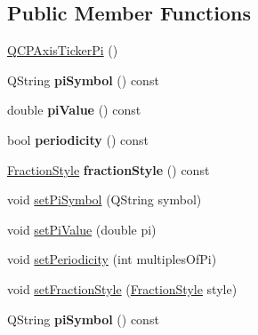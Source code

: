 \subsection*{Public Member Functions}
\begin{DoxyCompactItemize}
\item 
\hyperlink{class_q_c_p_axis_ticker_pi_aa0d7b7034055927c0f0077a2d713d7d0}{Q\+C\+P\+Axis\+Ticker\+Pi} ()
\item 
\mbox{\label{class_q_c_p_axis_ticker_pi_a2fd785cd66a6f4f969ac2eca1b08e0f2}} 
Q\+String {\bfseries pi\+Symbol} () const
\item 
\mbox{\label{class_q_c_p_axis_ticker_pi_abddc18799caa4ae6c721e1e5e229b3a4}} 
double {\bfseries pi\+Value} () const
\item 
\mbox{\label{class_q_c_p_axis_ticker_pi_aa320edf0a30386ce6a63c18050fbdfd8}} 
bool {\bfseries periodicity} () const
\item 
\mbox{\label{class_q_c_p_axis_ticker_pi_ab532d5e838168a8a5bbafea4eafc94be}} 
\hyperlink{class_q_c_p_axis_ticker_pi_a262f1534c7f0c79a7d5237f5d1e2c54c}{Fraction\+Style} {\bfseries fraction\+Style} () const
\item 
void \hyperlink{class_q_c_p_axis_ticker_pi_acfdcd4758a393bde4be12a50fb2017b5}{set\+Pi\+Symbol} (Q\+String symbol)
\item 
void \hyperlink{class_q_c_p_axis_ticker_pi_a36ce0651d2ec92edd36feac1619c2468}{set\+Pi\+Value} (double pi)
\item 
void \hyperlink{class_q_c_p_axis_ticker_pi_a58f538dc01860fb56e46970e28a87f03}{set\+Periodicity} (int multiples\+Of\+Pi)
\item 
void \hyperlink{class_q_c_p_axis_ticker_pi_a760c8af6ca68178e607556c4e5049d71}{set\+Fraction\+Style} (\hyperlink{class_q_c_p_axis_ticker_pi_a262f1534c7f0c79a7d5237f5d1e2c54c}{Fraction\+Style} style)
\item 
\mbox{\label{class_q_c_p_axis_ticker_pi_a2fd785cd66a6f4f969ac2eca1b08e0f2}} 
Q\+String {\bfseries pi\+Symbol} () const
\item 
\mbox{\label{class_q_c_p_axis_ticker_pi_abddc18799caa4ae6c721e1e5e229b3a4}} 

\end{DoxyCompactItemize}

